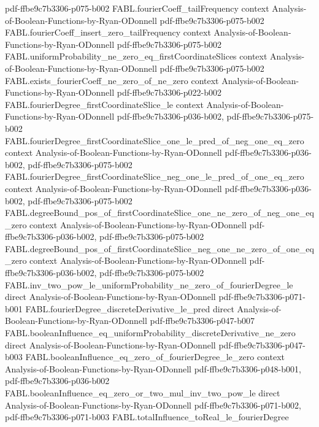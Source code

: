 \begin{theorem}
{    pdf-ffbe9c7b3306-p075-b002}
\proofstep
  {FABL.fourierCoeff_tailFrequency}
  {context}
  {Analysis-of-Boolean-Functions-by-Ryan-ODonnell}
  {pdf-ffbe9c7b3306-p075-b002}
\proofstep
  {FABL.fourierCoeff_insert_zero_tailFrequency}
  {context}
  {Analysis-of-Boolean-Functions-by-Ryan-ODonnell}
  {pdf-ffbe9c7b3306-p075-b002}
\proofstep
  {FABL.uniformProbability_ne_zero_eq_firstCoordinateSlices}
  {context}
  {Analysis-of-Boolean-Functions-by-Ryan-ODonnell}
  {pdf-ffbe9c7b3306-p075-b002}
\proofstep
  {FABL.exists_fourierCoeff_ne_zero_of_ne_zero}
  {context}
  {Analysis-of-Boolean-Functions-by-Ryan-ODonnell}
  {pdf-ffbe9c7b3306-p022-b002}
\proofstep
  {FABL.fourierDegree_firstCoordinateSlice_le}
  {context}
  {Analysis-of-Boolean-Functions-by-Ryan-ODonnell}
  {pdf-ffbe9c7b3306-p036-b002,
    pdf-ffbe9c7b3306-p075-b002}
\proofstep
  {FABL.fourierDegree_firstCoordinateSlice_one_le_pred_of_neg_one_eq_zero}
  {context}
  {Analysis-of-Boolean-Functions-by-Ryan-ODonnell}
  {pdf-ffbe9c7b3306-p036-b002,
    pdf-ffbe9c7b3306-p075-b002}
\proofstep
  {FABL.fourierDegree_firstCoordinateSlice_neg_one_le_pred_of_one_eq_zero}
  {context}
  {Analysis-of-Boolean-Functions-by-Ryan-ODonnell}
  {pdf-ffbe9c7b3306-p036-b002,
    pdf-ffbe9c7b3306-p075-b002}
\proofstep
  {FABL.degreeBound_pos_of_firstCoordinateSlice_one_ne_zero_of_neg_one_eq_zero}
  {context}
  {Analysis-of-Boolean-Functions-by-Ryan-ODonnell}
  {pdf-ffbe9c7b3306-p036-b002,
    pdf-ffbe9c7b3306-p075-b002}
\proofstep
  {FABL.degreeBound_pos_of_firstCoordinateSlice_neg_one_ne_zero_of_one_eq_zero}
  {context}
  {Analysis-of-Boolean-Functions-by-Ryan-ODonnell}
  {pdf-ffbe9c7b3306-p036-b002,
    pdf-ffbe9c7b3306-p075-b002}
\proofstep
  {FABL.inv_two_pow_le_uniformProbability_ne_zero_of_fourierDegree_le}
  {direct}
  {Analysis-of-Boolean-Functions-by-Ryan-ODonnell}
  {pdf-ffbe9c7b3306-p071-b001}
\proofstep
  {FABL.fourierDegree_discreteDerivative_le_pred}
  {direct}
  {Analysis-of-Boolean-Functions-by-Ryan-ODonnell}
  {pdf-ffbe9c7b3306-p047-b007}
\proofstep
  {FABL.booleanInfluence_eq_uniformProbability_discreteDerivative_ne_zero}
  {direct}
  {Analysis-of-Boolean-Functions-by-Ryan-ODonnell}
  {pdf-ffbe9c7b3306-p047-b003}
\proofstep
  {FABL.booleanInfluence_eq_zero_of_fourierDegree_le_zero}
  {context}
  {Analysis-of-Boolean-Functions-by-Ryan-ODonnell}
  {pdf-ffbe9c7b3306-p048-b001,
    pdf-ffbe9c7b3306-p036-b002}
\proofstep
  {FABL.booleanInfluence_eq_zero_or_two_mul_inv_two_pow_le}
  {direct}
  {Analysis-of-Boolean-Functions-by-Ryan-ODonnell}
  {pdf-ffbe9c7b3306-p071-b002,
    pdf-ffbe9c7b3306-p071-b003}
\proofstep
  {FABL.totalInfluence_toReal_le_fourierDegree}

\end{theorem}
